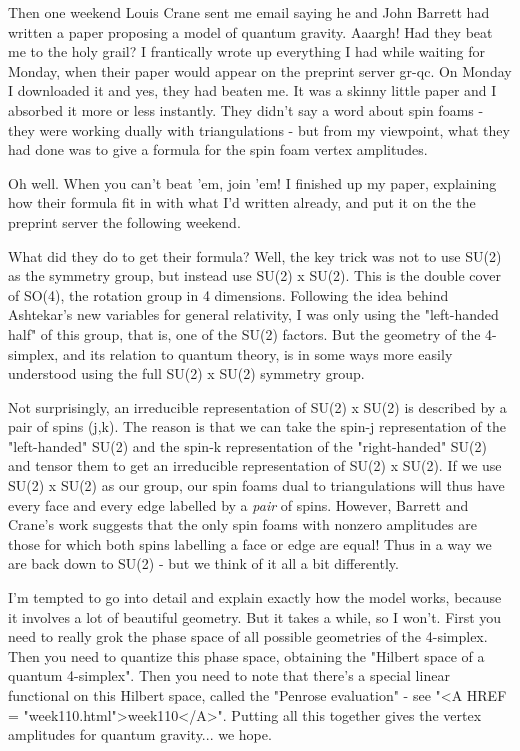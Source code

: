 Then one weekend Louis Crane sent me email saying he and John Barrett
had written a paper proposing a model of quantum gravity.  Aaargh!  Had
they beat me to the holy grail?  I frantically wrote up everything I had
while waiting for Monday, when their paper would appear on the preprint
server gr-qc.  On Monday I downloaded it and yes, they had beaten me.
It was a skinny little paper and I absorbed it more or less instantly.
They didn't say a word about spin foams - they were working dually
with triangulations - but from my viewpoint, what they had done was to
give a formula for the spin foam vertex amplitudes.

Oh well.  When you can't beat 'em, join 'em!  I finished up my paper,
explaining how their formula fit in with what I'd written already, and
put it on the the preprint server the following weekend.

What did they do to get their formula?  Well, the key trick was not to
use SU(2) as the symmetry group, but instead use SU(2) x SU(2).  This is
the double cover of SO(4), the rotation group in 4 dimensions.  Following 
the idea behind Ashtekar's new variables for general relativity, I was 
only using the "left-handed half" of this group, that is, one of the 
SU(2) factors.  But the geometry of the 4-simplex, and its relation to 
quantum theory, is in some ways more easily understood using the full 
SU(2) x SU(2) symmetry group.

Not surprisingly, an irreducible representation of SU(2) x SU(2) is
described by a pair of spins (j,k).  The reason is that we can take the
spin-j representation of the "left-handed" SU(2) and the spin-k
representation of the "right-handed" SU(2) and tensor them to get an
irreducible representation of SU(2) x SU(2).  If we use SU(2) x SU(2) as
our group, our spin foams dual to triangulations will thus have every
face and every edge labelled by a \emph{pair} of spins.  However, Barrett and
Crane's work suggests that the only spin foams with nonzero amplitudes
are those for which both spins labelling a face or edge are equal!  Thus
in a way we are back down to SU(2) - but we think of it all a bit
differently.

I'm tempted to go into detail and explain exactly how the model works,
because it involves a lot of beautiful geometry.  But it takes a while,
so I won't.  First you need to really grok the phase space of all
possible geometries of the 4-simplex.  Then you need to quantize this
phase space, obtaining the "Hilbert space of a quantum 4-simplex".  Then
you need to note that there's a special linear functional on this
Hilbert space, called the "Penrose evaluation" - see "<A HREF = "week110.html">week110</A>".
Putting all this together gives the vertex amplitudes for quantum
gravity... we hope.  

